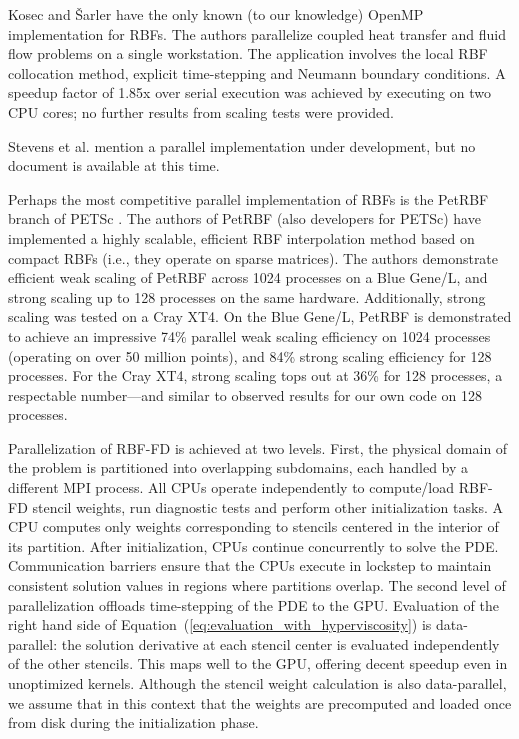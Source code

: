 \documentclass[11pt]{report}
\begin{document}
Kosec and \v{S}arler \cite{Kosec2008} have the only known (to our knowledge) OpenMP implementation for RBFs. The authors parallelize coupled heat transfer 
and fluid flow problems on a single workstation. 
The application involves the local RBF collocation method, explicit time-stepping and Neumann boundary conditions. A speedup 
factor of 1.85x over serial execution was achieved by executing on two CPU cores; no further 
results from scaling tests were provided. 

Stevens et al. \cite{Stevens2009a} mention a parallel implementation under development, but no document is available at this time. 

Perhaps the most competitive parallel implementation of RBFs is the PetRBF \cite{Yokota2010} branch of PETSc \cite{PETSc}. The authors of PetRBF (also developers for PETSc) have implemented a highly scalable, efficient RBF interpolation method based on compact RBFs (i.e., they operate on sparse matrices). The authors demonstrate efficient weak scaling of PetRBF across 1024 processes on a Blue Gene/L, and strong scaling up to 128 processes on the same hardware. Additionally, strong scaling was tested on a Cray XT4. On the Blue Gene/L, PetRBF is demonstrated to achieve an impressive 74\% parallel weak scaling efficiency on 1024 processes (operating on over 50 million points), and 84\% strong scaling efficiency for 128 processes. For the Cray XT4, strong scaling tops out at 36\% for 128 processes, a respectable number---and similar to observed results for our own code on 128 processes.  


Parallelization of RBF-FD is achieved at two levels. First, the
physical domain of the problem is partitioned
into overlapping subdomains, each handled by a different MPI process. All CPUs
operate independently to compute/load RBF-FD stencil weights, run diagnostic
tests and perform other initialization tasks. A CPU computes only weights
corresponding to stencils centered in the interior of its partition. After
initialization, CPUs continue concurrently to solve the PDE. Communication
barriers ensure that the CPUs execute in lockstep to maintain consistent
solution values in regions where partitions overlap.  The second level of
parallelization offloads time-stepping of the PDE to the GPU.  Evaluation of
the right hand side of Equation~(\ref{eq:evaluation_with_hyperviscosity}) is
data-parallel: the solution derivative at each stencil center is evaluated
independently of the other stencils. This maps well to the GPU, offering decent
speedup even in unoptimized kernels. Although the stencil weight calculation is
also data-parallel, we assume that in this context that the weights are
precomputed and loaded once from disk during the initialization phase. 
\end{document}

